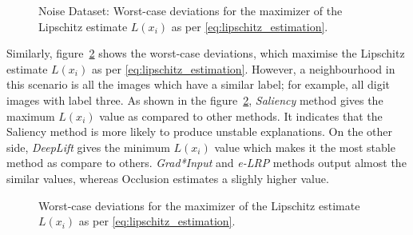 \documentclass[english]{tktltiki2}
\theoremstyle{definition}
\theoremstyle{remark}
\begin{document}
\begin{figure}[H]
	\centering
	\qquad
	\qquad
	\qquad
	\qquad
	\caption{Noise Dataset: Worst-case deviations for the maximizer of the Lipschitz estimate $L(x_i)$ as per \eqref{eq:lipschitz_estimation}.}%
	\label{fig:digit3_noise_deviations}%
\end{figure}

Similarly, figure~\ref{fig:digit3_deviations} shows the worst-case deviations, which maximise the Lipschitz estimate $L(x_i)$ as per \eqref{eq:lipschitz_estimation}. However, a neighbourhood in this scenario is all the images which have a similar label; for example, all digit images with label three. As shown in the figure~\ref{fig:digit3_deviations}, \textit{Saliency} method gives the maximum $L(x_i)$ value as compared to other methods. It indicates that the Saliency method is more likely to produce unstable explanations. On the other side, \textit{DeepLift} gives the minimum $L(x_i)$ value which makes it the most stable method as compare to others. \textit{Grad*Input} and \textit{e-LRP} methods output almost the similar values, whereas Occlusion estimates a slighly higher value.

\begin{figure}[H]
	\vspace*{-5mm}
	\centering
	\qquad
	\qquad
	\qquad
	\qquad
	\caption{Worst-case deviations for the maximizer of the Lipschitz estimate $L(x_i)$ as per \eqref{eq:lipschitz_estimation}.}%
	\label{fig:digit3_deviations}%
\end{figure}
\end{document}
